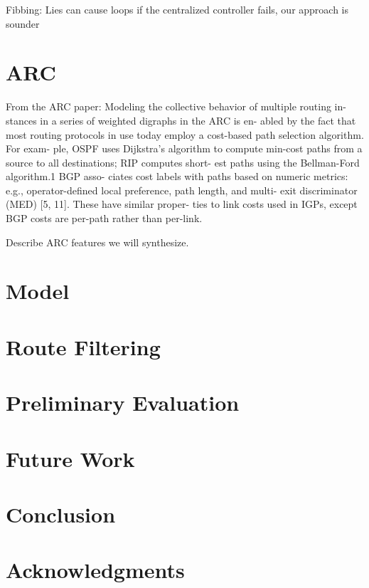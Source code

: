 \documentclass{hotnets16}
\begin{document}
Fibbing: Lies can cause loops if the centralized controller fails,
our approach is sounder

\section{ARC}
From the ARC paper:
Modeling the collective behavior of multiple routing in- stances in a series of weighted digraphs in the ARC is en- abled by the fact that most routing protocols in use today employ a cost-based path selection algorithm. For exam- ple, OSPF uses Dijkstra’s algorithm to compute min-cost paths from a source to all destinations; RIP computes short- est paths using the Bellman-Ford algorithm.1 BGP asso- ciates cost labels with paths based on numeric metrics: e.g., operator-defined local preference, path length, and multi- exit discriminator (MED) [5, 11]. These have similar proper- ties to link costs used in IGPs, except BGP costs are per-path rather than per-link.


Describe ARC features we will synthesize.

\section{Model}

\section{Route Filtering}

\section{Preliminary Evaluation}

\section{Future Work}

\section{Conclusion}

\section*{Acknowledgments}

 
\begin{small}

\end{small}
\label{last-page}
\end{document}
